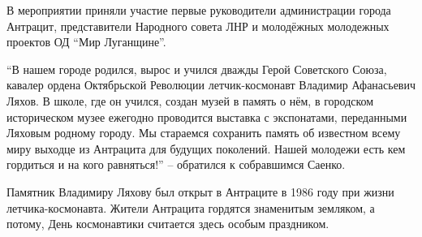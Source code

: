 В мероприятии приняли участие первые руководители администрации города
Антрацит, представители Народного совета ЛНР и молодёжных молодежных проектов
ОД \enquote{Мир Луганщине}. 

\enquote{В нашем городе родился, вырос и учился дважды Герой Советского Союза, кавалер
ордена Октябрьской Революции летчик-космонавт Владимир Афанасьевич Ляхов. В
школе, где он учился, создан музей в память о нём, в городском историческом
музее ежегодно проводится выставка с экспонатами, переданными Ляховым родному
городу. Мы стараемся сохранить память об известном всему миру выходце из
Антрацита для будущих поколений. Нашей молодежи есть кем гордиться и на кого
равняться!} – обратился к собравшимся Саенко.

Памятник Владимиру Ляхову был открыт в Антраците в 1986 году при жизни
летчика-космонавта.  Жители Антрацита гордятся знаменитым земляком, а потому,
День космонавтики считается здесь особым праздником.
